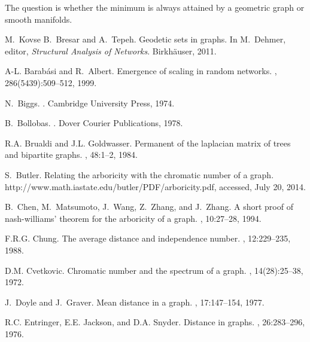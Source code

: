 \documentclass[12pt]{amsart}
\theoremstyle{definition}
\begin{document}
The question is whether the minimum is always attained by a geometric graph or
smooth manifolds. 





\begin{thebibliography}{10}

M.~Kovse B.~Bresar and A.~Tepeh.
\newblock Geodetic sets in graphs.
\newblock In M.~Dehmer, editor, {\em Structural Analysis of Networks}.
  Birkh{\"a}user, 2011.

A-L. Barab{\'a}si and R.~Albert.
\newblock Emergence of scaling in random networks.
, 286(5439):509--512, 1999.

N.~Biggs.
.
\newblock Cambridge University Press, 1974.

B.~Bollobas.
.
\newblock Dover Courier Publications, 1978.

R.A. Brualdi and J.L. Goldwasser.
\newblock Permanent of the laplacian matrix of trees and bipartite graphs.
, 48:1--2, 1984.

S.~Butler.
\newblock Relating the arboricity with the chromatic number of a graph.
\newblock http://www.math.iastate.edu/butler/PDF/arboricity.pdf, accessed, July
  20, 2014.

B.~Chen, M.~Matsumoto, J.~Wang, Z.~Zhang, and J.~Zhang.
\newblock A short proof of nash-williams' theorem for the arboricity of a
  graph.
, 10:27--28, 1994.

F.R.G. Chung.
\newblock The average distance and independence number.
, 12:229--235, 1988.

D.M. Cvetkovic.
\newblock Chromatic number and the spectrum of a graph.
, 14(28):25--38, 1972.

J.~Doyle and J.~Graver.
\newblock Mean distance in a graph.
, 17:147--154, 1977.

R.C. Entringer, E.E. Jackson, and D.A. Snyder.
\newblock Distance in graphs.
, 26:283--296, 1976.


\end{thebibliography}
\end{document}
